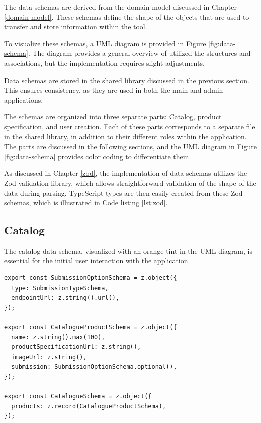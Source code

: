 The data schemas are derived from the domain model discussed in Chapter \ref{domain-model}. These schemas define the shape of the objects that are used to transfer and store information within the tool. 

To visualize these schemas, a UML diagram is provided in Figure \ref{fig:data-schema}. The diagram provides a general overview of utilized the structures and associations, but the implementation requires slight adjustments.

Data schemas are stored in the shared library discussed in the previous section. This ensures consistency, as they are used in both the main and admin applications. 

The schemas are organized into three separate parts: Catalog, product specification, and user creation. Each of these parts corresponds to a separate file in the shared library, in addition to their different roles within the application. The parts are discussed in the following sections, and the UML diagram in Figure \ref{fig:data-schema} provides color coding to differentiate them.

As discussed in Chapter \ref{zod}, the implementation of data schemas utilizes the Zod validation library, which allows straightforward validation of the shape of the data during parsing. TypeScript types are then easily created from these Zod schemas, which is illustrated in Code listing \ref{lst:zod}. \cite{Wycliffe2023} 


\subsection{Catalog}

The catalog data schema, visualized with an orange tint in the UML diagram, is essential for the initial user interaction with the application.

\begin{lstlisting}[caption={~Catalogue schema},label={lst:schema-catalogue},captionpos=b,abovecaptionskip=\medskipamount,belowcaptionskip=\medskipamount]
export const SubmissionOptionSchema = z.object({
  type: SubmissionTypeSchema,
  endpointUrl: z.string().url(),
});

export const CatalogueProductSchema = z.object({
  name: z.string().max(100),
  productSpecificationUrl: z.string(),
  imageUrl: z.string(),
  submission: SubmissionOptionSchema.optional(),
});

export const CatalogueSchema = z.object({
  products: z.record(CatalogueProductSchema),
});
\end{lstlisting}

